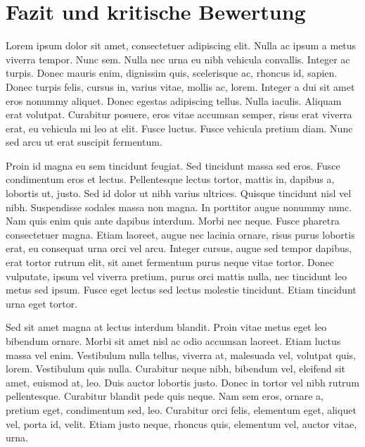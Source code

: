 \chapter{Fazit und kritische Bewertung}
\label{cha:Fazit}
Lorem ipsum dolor sit amet, consectetuer adipiscing elit. Nulla ac ipsum a metus viverra tempor. Nunc sem. Nulla nec urna eu nibh vehicula convallis. Integer ac turpis. Donec mauris enim, dignissim quis, scelerisque ac, rhoncus id, sapien. Donec turpis felis, cursus in, varius vitae, mollis ac, lorem. Integer a dui sit amet eros nonummy aliquet. Donec egestas adipiscing tellus. Nulla iaculis. Aliquam erat volutpat. Curabitur posuere, eros vitae accumsan semper, risus erat viverra erat, eu vehicula mi leo at elit. Fusce luctus. Fusce vehicula pretium diam. Nunc sed arcu ut erat suscipit fermentum.

Proin id magna eu sem tincidunt feugiat. Sed tincidunt massa sed eros. Fusce condimentum eros et lectus. Pellentesque lectus tortor, mattis in, dapibus a, lobortis ut, justo. Sed id dolor ut nibh varius ultrices. Quisque tincidunt nisl vel nibh. Suspendisse sodales massa non magna. In porttitor augue nonummy nunc. Nam quis enim quis ante dapibus interdum. Morbi nec neque. Fusce pharetra consectetuer magna. Etiam laoreet, augue nec lacinia ornare, risus purus lobortis erat, eu consequat urna orci vel arcu. Integer cursus, augue sed tempor dapibus, erat tortor rutrum elit, sit amet fermentum purus neque vitae tortor. Donec vulputate, ipsum vel viverra pretium, purus orci mattis nulla, nec tincidunt leo metus sed ipsum. Fusce eget lectus sed lectus molestie tincidunt. Etiam tincidunt urna eget tortor.

Sed sit amet magna at lectus interdum blandit. Proin vitae metus eget leo bibendum ornare. Morbi sit amet nisl ac odio accumsan laoreet. Etiam luctus massa vel enim. Vestibulum nulla tellus, viverra at, malesuada vel, volutpat quis, lorem. Vestibulum quis nulla. Curabitur neque nibh, bibendum vel, eleifend sit amet, euismod at, leo. Duis auctor lobortis justo. Donec in tortor vel nibh rutrum pellentesque. Curabitur blandit pede quis neque. Nam sem eros, ornare a, pretium eget, condimentum sed, leo. Curabitur orci felis, elementum eget, aliquet vel, porta id, velit. Etiam justo neque, rhoncus quis, elementum vel, auctor vitae, urna.

